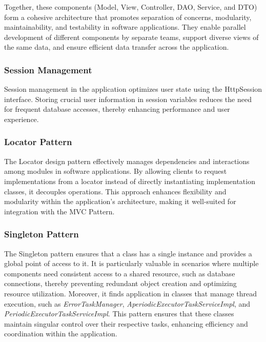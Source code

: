 \vspace{\baselineskip}

Together, these components (Model, View, Controller, DAO, Service, and DTO) form a cohesive architecture that promotes 
separation of concerns, modularity, maintainability, and testability in software applications. They enable parallel 
development of different components by separate teams, support diverse views of the same data, and ensure efficient data 
transfer across the application.

\subsubsection*{Session Management}

Session management in the application optimizes user state using the HttpSession interface. Storing crucial user information in session variables 
reduces the need for frequent database accesses, thereby enhancing performance and user experience.

\subsubsection*{Locator Pattern}

The Locator design pattern effectively manages dependencies and interactions among modules in software applications.
By allowing clients to request implementations from a locator instead of directly instantiating implementation 
classes, it decouples operations. This approach enhances flexibility and modularity within the application's 
architecture, making it well-suited for integration with the MVC Pattern.

\subsubsection*{Singleton Pattern}

The Singleton pattern ensures that a class has a single instance and provides a global point of access to it. It is 
particularly valuable in scenarios where multiple components need consistent access to a shared resource, such as 
database connections, thereby preventing redundant object creation and optimizing resource utilization. Moreover, 
it finds application in classes that manage thread execution, such as \textit{ErrorTaskManager}, 
\textit{AperiodicExecutorTaskServiceImpl}, and \textit{PeriodicExecutorTaskServiceImpl}. This pattern ensures that 
these classes maintain singular control over their respective tasks, enhancing efficiency and coordination within the application.

